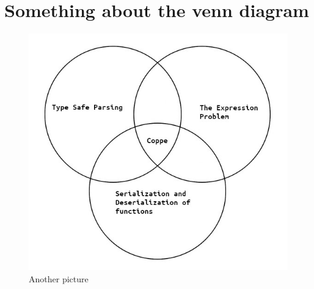 \section{Something about the venn diagram}



\begin{figure}
  \centering
  \includegraphics[width=\columnwidth]{pictures/problem.jpg}
  \caption{Another picture}
\end{figure}
